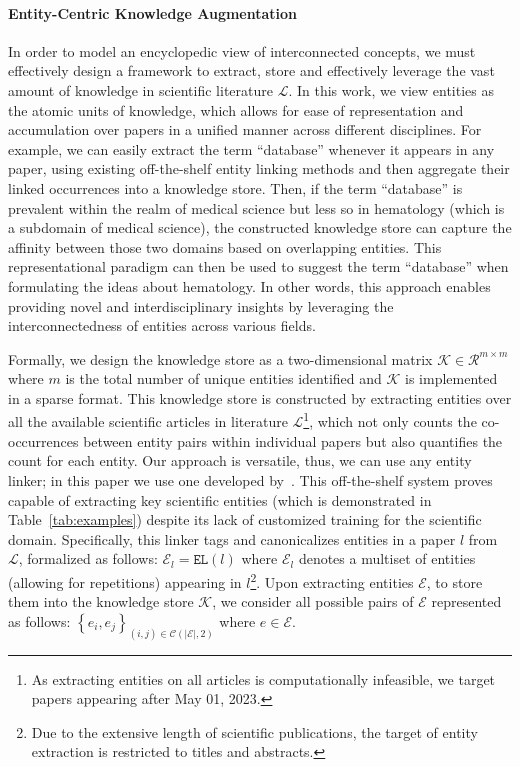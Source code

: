 \paragraph{Entity-Centric Knowledge Augmentation}
In order to model an encyclopedic view of interconnected concepts, we must effectively design a framework to extract, store and effectively leverage the vast amount of knowledge in scientific literature $\mathcal{L}$. In this work, we view entities as the atomic units of knowledge, which allows for ease of representation and accumulation over papers in a unified manner across different disciplines. For example, we can easily extract the term ``database'' whenever it appears in any paper, using existing off-the-shelf entity linking methods and then aggregate their linked occurrences into a knowledge store. Then, if the term ``database'' is prevalent within the realm of medical science but less so in hematology (which is a subdomain of medical science), the constructed knowledge store can capture the affinity between those two domains based on overlapping entities. This representational paradigm can then be used to suggest the term ``database'' when formulating the ideas about hematology. In other words, this approach enables providing novel and interdisciplinary insights by leveraging the interconnectedness of entities across various fields.

Formally, we design the knowledge store as a two-dimensional matrix $\mathcal{K} \in \mathcal{R}^{m \times m}$ where $m$ is the total number of unique entities identified and $\mathcal{K}$ is implemented in a sparse format. This knowledge store is constructed by extracting entities over all the available scientific articles in literature $\mathcal{L}$\footnote{As extracting entities on all articles is computationally infeasible, we target papers appearing after May 01, 2023.}, which not only counts the co-occurrences between entity pairs within individual papers but also quantifies the count for each entity. Our approach is versatile, thus, we can use any entity linker; in this paper we use one developed by~\citet{blink}. This off-the-shelf system proves capable of extracting key scientific entities (which is demonstrated in Table~\ref{tab:examples}) despite its lack of customized training for the scientific domain. Specifically, this linker tags and canonicalizes entities in a paper $l$ from $\mathcal{L}$, formalized as follows: $\mathcal{E}_l = \texttt{EL}(l)$ where $\mathcal{E}_l$ denotes a multiset of entities (allowing for repetitions) appearing in $l$\footnote{Due to the extensive length of scientific publications, the target of entity extraction is restricted to titles and abstracts.}. Upon extracting entities $\mathcal{E}$, to store them into the knowledge store $\mathcal{K}$, we consider all possible pairs of $\mathcal{E}$ represented as follows: $\left\{ e_i, e_j \right\}_{(i, j) \in \mathcal{C}(|\mathcal{E}|, 2)}$ where $e \in \mathcal{E}$.

